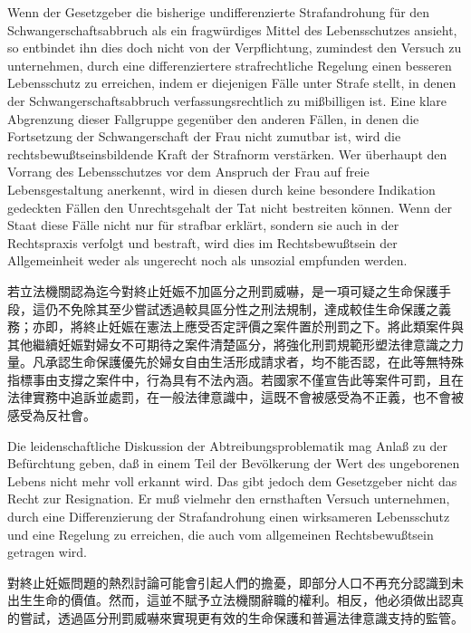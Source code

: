 \documentclass[12pt]{article}
\begin{document}
\syncleft
\begin{sourcepara}
Wenn der Gesetzgeber die bisherige undifferenzierte Strafandrohung für den Schwangerschaftsabbruch als ein fragwürdiges Mittel des Lebensschutzes ansieht, so entbindet ihn dies doch nicht von der Verpflichtung, zumindest den Versuch zu unternehmen, durch eine differenziertere strafrechtliche Regelung einen besseren Lebensschutz zu erreichen, indem er diejenigen Fälle unter Strafe stellt, in denen der Schwangerschaftsabbruch verfassungsrechtlich zu mißbilligen ist. Eine klare Abgrenzung dieser Fallgruppe gegenüber den anderen Fällen, in denen die Fortsetzung der Schwangerschaft der Frau nicht zumutbar ist, wird die rechtsbewußtseinsbildende Kraft der Strafnorm verstärken. Wer überhaupt den Vorrang des Lebensschutzes vor dem Anspruch der Frau auf freie Lebensgestaltung anerkennt, wird in diesen durch keine besondere Indikation gedeckten Fällen den Unrechtsgehalt der Tat nicht bestreiten können. Wenn der Staat diese Fälle nicht nur für strafbar erklärt, sondern sie auch in der Rechtspraxis verfolgt und bestraft, wird dies im Rechtsbewußtsein der Allgemeinheit weder als ungerecht noch als unsozial empfunden werden.
\end{sourcepara}
\begin{transpara}
若立法機關認為迄今對終止妊娠不加區分之刑罰威嚇，是一項可疑之生命保護手段，這仍不免除其至少嘗試透過較具區分性之刑法規制，達成較佳生命保護之義務；亦即，將終止妊娠在憲法上應受否定評價之案件置於刑罰之下。將此類案件與其他繼續妊娠對婦女不可期待之案件清楚區分，將強化刑罰規範形塑法律意識之力量。凡承認生命保護優先於婦女自由生活形成請求者，均不能否認，在此等無特殊指標事由支撐之案件中，行為具有不法內涵。若國家不僅宣告此等案件可罰，且在法律實務中追訴並處罰，在一般法律意識中，這既不會被感受為不正義，也不會被感受為反社會。
\end{transpara}

\syncleft
\begin{sourcepara}
Die leidenschaftliche Diskussion der Abtreibungsproblematik mag Anlaß zu der Befürchtung geben, daß in einem Teil der Bevölkerung der Wert des ungeborenen Lebens nicht mehr voll erkannt wird. Das gibt jedoch dem Gesetzgeber nicht das Recht zur Resignation. Er muß vielmehr den ernsthaften Versuch unternehmen, durch eine Differenzierung der Strafandrohung einen wirksameren Lebensschutz und eine Regelung zu erreichen, die auch vom allgemeinen Rechtsbewußtsein getragen wird.
\end{sourcepara}
\begin{transpara}
對終止妊娠問題的熱烈討論可能會引起人們的擔憂，即部分人口不再充分認識到未出生生命的價值。然而，這並不賦予立法機關辭職的權利。相反，他必須做出認真的嘗試，透過區分刑罰威嚇來實現更有效的生命保護和普遍法律意識支持的監管。
\end{transpara}
\end{document}
